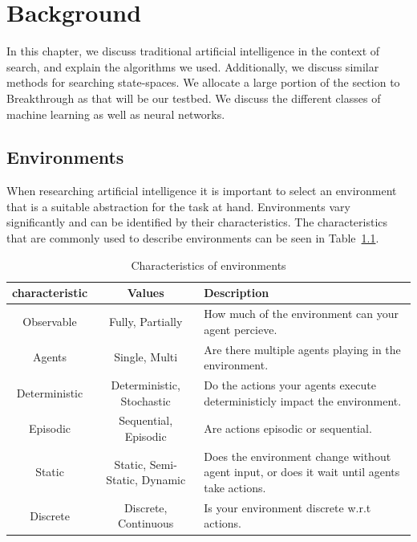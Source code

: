 \chapter{Background\label{cha:background}}

In this chapter, we discuss traditional artificial intelligence in the context of search, and explain the algorithms we used. Additionally, we discuss similar methods for searching state-spaces. We allocate a large portion of the section to Breakthrough as that will be our testbed. We discuss the different classes of machine learning as well as neural networks.

\section{Environments}
\label{sec:environments}

When researching artificial intelligence it is important to select an environment that is a suitable abstraction for the task at hand. Environments vary significantly and can be identified by their characteristics. The characteristics that are commonly used to describe environments can be seen in Table~\ref{tab:env_characteristics}\cite{Russell:AIModern}.

\begin{table}[ht]
	\centering
	\caption{Characteristics of environments}
	\begin{tabular}{|c|c|p{6cm}|}
		\hline
		\textbf{characteristic} & \textbf{Values}              & \textbf{Description}                                                                 \\
		\hline
		Observable              & Fully, Partially             & How much of the environment can your agent percieve.                                 \\
		\hline
		Agents                  & Single, Multi                & Are there multiple agents playing in the environment.                                \\
		\hline
		Deterministic           & Deterministic, Stochastic    & Do the actions your agents execute deterministicly impact the environment.                 \\
		\hline
		Episodic                & Sequential, Episodic         & Are actions episodic or sequential.                                                  \\
		\hline
		Static                  & Static, Semi-Static, Dynamic & Does the environment change without agent input, or does it wait until agents take actions. \\
		\hline
		Discrete                & Discrete, Continuous         & Is your environment discrete w.r.t actions.                                          \\
		\hline
	\end{tabular}
	\label{tab:env_characteristics}
\end{table}

